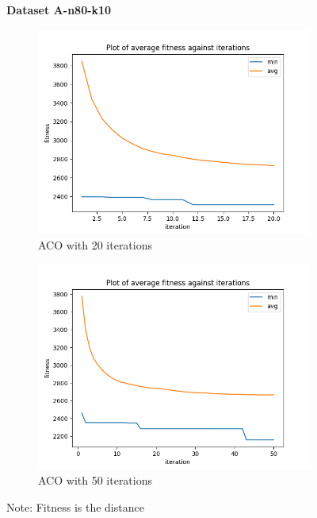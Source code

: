 \documentclass[a4paper]{exam}
\begin{document}
\begin{questions}
  \begin{figure}[H]
    \centering
    \textbf{Dataset A-n80-k10}
    \begin{subfigure}{.5\textwidth}
      \centering
      \includegraphics[width=1\linewidth]{images/n80-k10_20.png}
      \caption{ACO with 20 iterations}
      \label{fig:n80-k10_20}
    \end{subfigure}%
    \begin{subfigure}{.5\textwidth}
      \centering
      \includegraphics[width=1\linewidth]{images/n80-k10_50.png}
      \caption{ACO with 50 iterations}
      \label{fig:n80-k10_50}
    \end{subfigure}
    \caption{Note: Fitness is the distance}
    \label{fig:n80-k10}
  \end{figure}
\end{questions}
\end{document}
